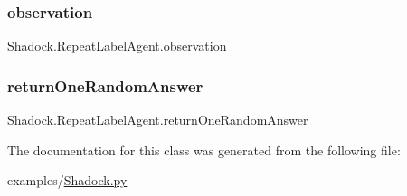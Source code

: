 \subsubsection{\texorpdfstring{observation}{observation}}
{\footnotesize\ttfamily Shadock.\+Repeat\+Label\+Agent.\+observation}

\mbox{\label{classShadock_1_1RepeatLabelAgent_af5000a81304581727384cf2546b5a238}} 
\subsubsection{\texorpdfstring{return\+One\+Random\+Answer}{returnOneRandomAnswer}}
{\footnotesize\ttfamily Shadock.\+Repeat\+Label\+Agent.\+return\+One\+Random\+Answer}



The documentation for this class was generated from the following file\+:\begin{DoxyCompactItemize}
\item 
examples/\hyperlink{Shadock_8py}{Shadock.\+py}\end{DoxyCompactItemize}
